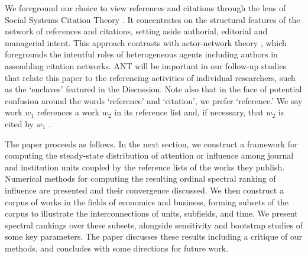 We foreground our choice to view references and citations through the lens of Social Systems Citation Theory \citep[][SSCT]{tahamtanSocialSystemsCitation2022}. It concentrates on the structural features of the network of references and citations, setting aside authorial, editorial and managerial intent. This approach contrasts with actor-network theory \citep[][ANT]{latourReassemblingSocialIntroduction2007}, which foregrounds the intentful roles of heterogeneous agents including authors
in assembling citation networks. ANT will be important in our follow-up studies that relate this paper to the referencing activities of individual researchers, such as the `enclaves' featured in the Discussion. Note also that in the face of potential confusion around the words `reference' and `citation', we prefer `reference.' We say work $w_1$ references a work $w_2$ in its reference list and, if necessary, that $w_2$ is cited by $w_1$ \citep{woutersCitationCulture1999}.

The paper proceeds as follows. In the next section, we construct a framework for computing the steady-state distribution of attention or influence among journal and institution units coupled by the reference lists of the works they publish. Numerical methods for computing the resulting ordinal spectral ranking of influence are presented and their convergence discussed.  We then construct a corpus of works in the fields of economics and business, forming subsets of the corpus to illustrate the interconnections of units, subfields, and time. We present spectral rankings over these subsets, alongside sensitivity and bootstrap studies of some key parameters. The paper discusses these results including a critique of our methods, and concludes with some directions for future work.


